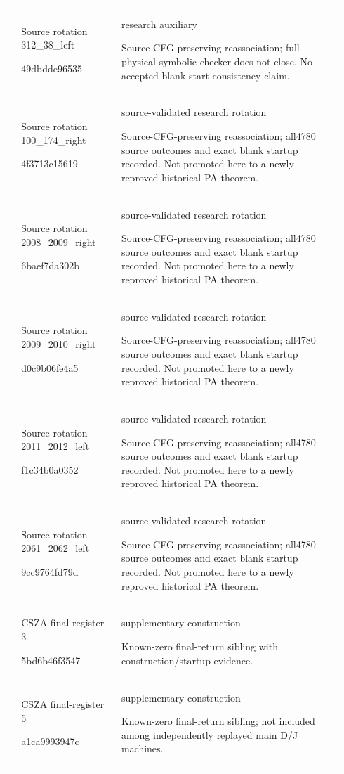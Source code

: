 {\begin{longtable}{@{}>{\raggedright\arraybackslash}p{0.035\linewidth}>{\raggedright\arraybackslash}p{0.28\linewidth}>{\raggedright\arraybackslash}p{0.625\linewidth}@{}}
70 & Source rotation 312\_38\_left\par{\ttfamily 49dbdde96535} & research auxiliary\par Source-CFG-preserving reassociation; full physical symbolic checker does not close. No accepted blank-start consistency claim.\\[4pt]
71 & Source rotation 100\_174\_right\par{\ttfamily 4f3713c15619} & source-validated research rotation\par Source-CFG-preserving reassociation; all4780 source outcomes and exact blank startup recorded. Not promoted here to a newly reproved historical PA theorem.\\[4pt]
72 & Source rotation 2008\_2009\_right\par{\ttfamily 6baef7da302b} & source-validated research rotation\par Source-CFG-preserving reassociation; all4780 source outcomes and exact blank startup recorded. Not promoted here to a newly reproved historical PA theorem.\\[4pt]
73 & Source rotation 2009\_2010\_right\par{\ttfamily d0c9b06fe4a5} & source-validated research rotation\par Source-CFG-preserving reassociation; all4780 source outcomes and exact blank startup recorded. Not promoted here to a newly reproved historical PA theorem.\\[4pt]
74 & Source rotation 2011\_2012\_left\par{\ttfamily f1c34b0a0352} & source-validated research rotation\par Source-CFG-preserving reassociation; all4780 source outcomes and exact blank startup recorded. Not promoted here to a newly reproved historical PA theorem.\\[4pt]
75 & Source rotation 2061\_2062\_left\par{\ttfamily 9cc9764fd79d} & source-validated research rotation\par Source-CFG-preserving reassociation; all4780 source outcomes and exact blank startup recorded. Not promoted here to a newly reproved historical PA theorem.\\[4pt]
76 & CSZA final-register 3\par{\ttfamily 5bd6b46f3547} & supplementary construction\par Known-zero final-return sibling with construction/startup evidence.\\[4pt]
77 & CSZA final-register 5\par{\ttfamily a1ca9993947c} & supplementary construction\par Known-zero final-return sibling; not included among independently replayed main D/J machines.\\[4pt]

\end{longtable}}
